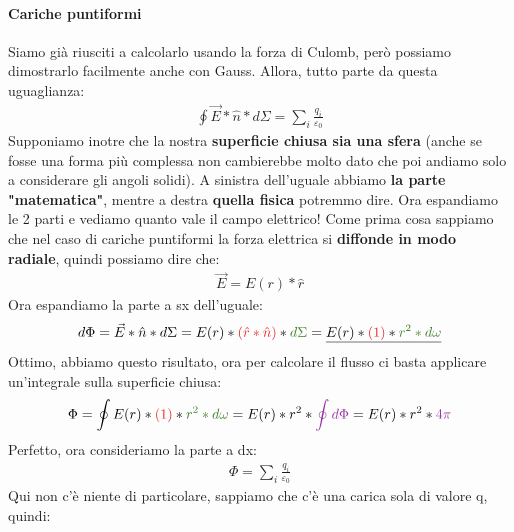                 \paragraph{Cariche puntiformi}
                    Siamo già riusciti a calcolarlo usando la forza di Culomb, però possiamo dimostrarlo facilmente anche con Gauss. Allora, tutto parte da questa uguaglianza:
                    \begin{align*}
                        \oint\vec{E}*\hat{n}*d\Sigma = \sum_i\frac{q_i}{\varepsilon_0}
                    \end{align*}
                    Supponiamo inotre che la nostra \textbf{superficie chiusa sia una sfera} (anche se fosse una forma più complessa non cambierebbe molto dato che poi andiamo solo a considerare gli angoli solidi). 
                    A sinistra dell'uguale abbiamo \textbf{la parte "matematica"}, mentre a destra \textbf{quella fisica} potremmo dire. Ora espandiamo le 2 parti e vediamo quanto vale il campo elettrico! Come prima cosa sappiamo che nel caso di cariche puntiformi la forza elettrica si \textbf{diffonde in modo radiale}, quindi possiamo dire che:
                    \begin{align*}
                        \vec{E}=E(r)*\hat{r}
                    \end{align*}
                    Ora espandiamo la parte a sx dell'uguale:
                    \begin{align*}
                        d\Phi=\vec{E}*\hat{n}*d\Sigma = E(r)*\textcolor{Red}{(\hat{r}*\hat{n})}*\textcolor{OliveGreen}{d\Sigma} = \underline{E(r)*\textcolor{Red}{(1)}*\textcolor{OliveGreen}{r^2*d\omega}}
                    \end{align*}
                    Ottimo, abbiamo questo risultato, ora per calcolare il flusso ci basta applicare un'integrale sulla superficie chiusa:
                    \begin{align*}
                        \Phi = \oint E(r)*\textcolor{Red}{(1)}*\textcolor{OliveGreen}{r^2*d\omega} = E(r)*r^2*\textcolor{Purple}{\oint d\Phi} = E(r)*r^2*\textcolor{Purple}{4\pi}
                    \end{align*}
                    Perfetto, ora consideriamo la parte a dx:
                    \begin{align*}
                        \Phi = \sum_i\frac{q_i}{\varepsilon_0}
                    \end{align*}
                    Qui non c'è niente di particolare, sappiamo che c'è una carica sola di valore q, quindi:
